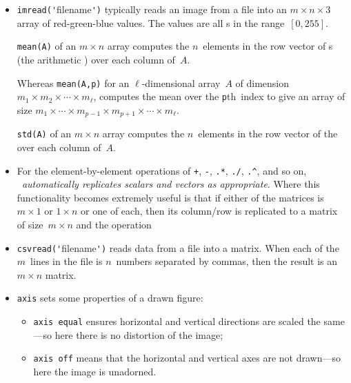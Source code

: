 \begin{itemize}
\begin{itemize}
\item  {}\verb|imread('|filename\verb|')| typically reads an image from a file into an \(m\times n\times 3\) array of red-green-blue values. 
The values are all s in the range~\([0,255]\).

\itemme {}\verb|mean(A)| of an \(m\times n\) array computes the \(n\)~elements in the row vector of s (the arithmetic ) over each column of~\(A\).

Whereas \verb|mean(A,p)| for an \(\ell\)-dimensional array~\(A\) of dimension \(m_1\times m_2\times\cdots\times m_\ell\),  computes the mean over the \verb|p|th~index to give an array of size \(m_1\times\cdots\times m_{p-1}\times m_{p+1}\times\cdots\times m_\ell\).

\itemme {}\verb|std(A)| of an \(m\times n\) array computes the \(n\)~elements in the row vector of the  over each column of~\(A\).

\item For the element-by-element operations of \verb|+|, \verb|-|, \verb|.*|, \verb|./|, \verb|.^|, and so on, \emph{\script\ automatically replicates scalars and vectors as appropriate}.
Where this functionality becomes extremely useful is that if either  of the matrices is \(m\times1\) or \(1\times n\) or one of each, then its column\slash row is replicated to a matrix of size~\(m\times n\) and the operation 

\item  {}\verb|csvread('|filename\verb|')| reads data from a file into a matrix.
When each of the \(m\)~lines in the file is \(n\)~numbers separated by commas, then the result is an \(m\times n\) matrix. 


\item {}\verb|axis| sets some properties of a drawn figure:
\begin{itemize}
\item \verb|axis equal| ensures horizontal and vertical directions are scaled the same---so here there is no distortion of the image;
\item \verb|axis off| means that the horizontal and vertical axes are not drawn---so here the image is unadorned.
\end{itemize}
\end{itemize}





\end{itemize}
